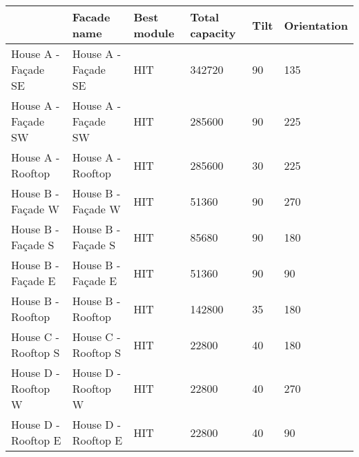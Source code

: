 \begin{tabular}{llllll}
\toprule
{} &          Facade name & Best module & Total capacity & Tilt & Orientation \\
\midrule
House A - Façade SE &  House A - Façade SE &         HIT &         342720 &   90 &         135 \\
House A - Façade SW &  House A - Façade SW &         HIT &         285600 &   90 &         225 \\
House A - Rooftop   &    House A - Rooftop &         HIT &         285600 &   30 &         225 \\
House B - Façade W  &   House B - Façade W &         HIT &          51360 &   90 &         270 \\
House B - Façade S  &   House B - Façade S &         HIT &          85680 &   90 &         180 \\
House B - Façade E  &   House B - Façade E &         HIT &          51360 &   90 &          90 \\
House B - Rooftop   &    House B - Rooftop &         HIT &         142800 &   35 &         180 \\
House C - Rooftop S &  House C - Rooftop S &         HIT &          22800 &   40 &         180 \\
House D - Rooftop W &  House D - Rooftop W &         HIT &          22800 &   40 &         270 \\
House D - Rooftop E &  House D - Rooftop E &         HIT &          22800 &   40 &          90 \\
\bottomrule
\end{tabular}
